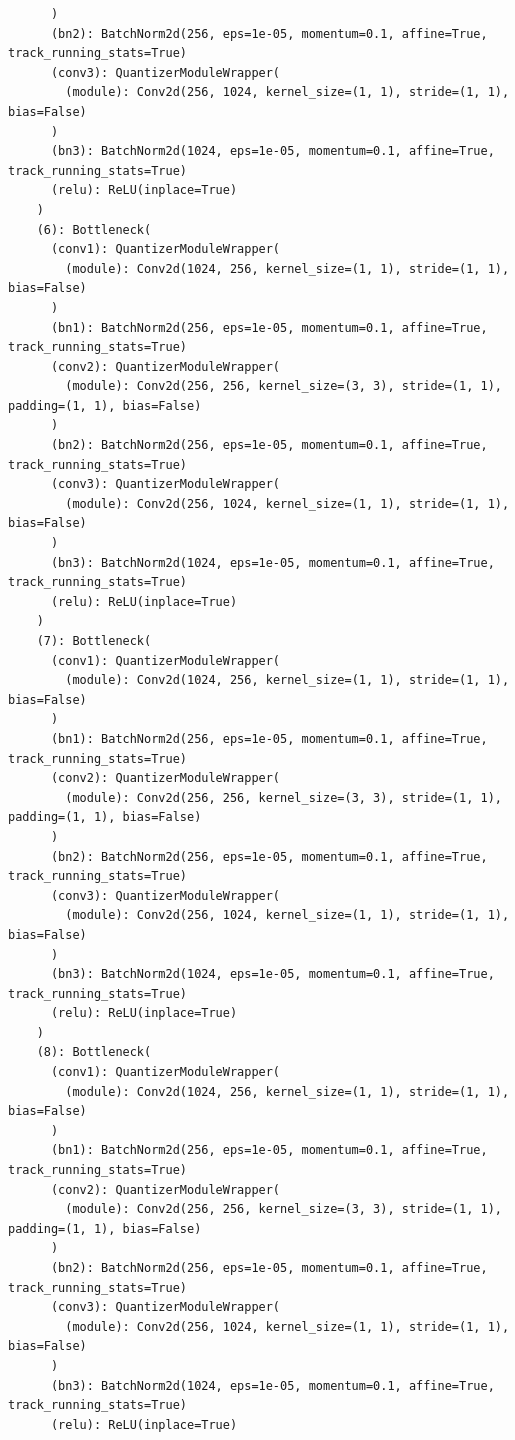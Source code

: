 \documentclass{article}
\begin{document}
\begin{verbatim}
      )
      (bn2): BatchNorm2d(256, eps=1e-05, momentum=0.1, affine=True, track_running_stats=True)
      (conv3): QuantizerModuleWrapper(
        (module): Conv2d(256, 1024, kernel_size=(1, 1), stride=(1, 1), bias=False)
      )
      (bn3): BatchNorm2d(1024, eps=1e-05, momentum=0.1, affine=True, track_running_stats=True)
      (relu): ReLU(inplace=True)
    )
    (6): Bottleneck(
      (conv1): QuantizerModuleWrapper(
        (module): Conv2d(1024, 256, kernel_size=(1, 1), stride=(1, 1), bias=False)
      )
      (bn1): BatchNorm2d(256, eps=1e-05, momentum=0.1, affine=True, track_running_stats=True)
      (conv2): QuantizerModuleWrapper(
        (module): Conv2d(256, 256, kernel_size=(3, 3), stride=(1, 1), padding=(1, 1), bias=False)
      )
      (bn2): BatchNorm2d(256, eps=1e-05, momentum=0.1, affine=True, track_running_stats=True)
      (conv3): QuantizerModuleWrapper(
        (module): Conv2d(256, 1024, kernel_size=(1, 1), stride=(1, 1), bias=False)
      )
      (bn3): BatchNorm2d(1024, eps=1e-05, momentum=0.1, affine=True, track_running_stats=True)
      (relu): ReLU(inplace=True)
    )
    (7): Bottleneck(
      (conv1): QuantizerModuleWrapper(
        (module): Conv2d(1024, 256, kernel_size=(1, 1), stride=(1, 1), bias=False)
      )
      (bn1): BatchNorm2d(256, eps=1e-05, momentum=0.1, affine=True, track_running_stats=True)
      (conv2): QuantizerModuleWrapper(
        (module): Conv2d(256, 256, kernel_size=(3, 3), stride=(1, 1), padding=(1, 1), bias=False)
      )
      (bn2): BatchNorm2d(256, eps=1e-05, momentum=0.1, affine=True, track_running_stats=True)
      (conv3): QuantizerModuleWrapper(
        (module): Conv2d(256, 1024, kernel_size=(1, 1), stride=(1, 1), bias=False)
      )
      (bn3): BatchNorm2d(1024, eps=1e-05, momentum=0.1, affine=True, track_running_stats=True)
      (relu): ReLU(inplace=True)
    )
    (8): Bottleneck(
      (conv1): QuantizerModuleWrapper(
        (module): Conv2d(1024, 256, kernel_size=(1, 1), stride=(1, 1), bias=False)
      )
      (bn1): BatchNorm2d(256, eps=1e-05, momentum=0.1, affine=True, track_running_stats=True)
      (conv2): QuantizerModuleWrapper(
        (module): Conv2d(256, 256, kernel_size=(3, 3), stride=(1, 1), padding=(1, 1), bias=False)
      )
      (bn2): BatchNorm2d(256, eps=1e-05, momentum=0.1, affine=True, track_running_stats=True)
      (conv3): QuantizerModuleWrapper(
        (module): Conv2d(256, 1024, kernel_size=(1, 1), stride=(1, 1), bias=False)
      )
      (bn3): BatchNorm2d(1024, eps=1e-05, momentum=0.1, affine=True, track_running_stats=True)
      (relu): ReLU(inplace=True)

\end{verbatim}
\end{document}
